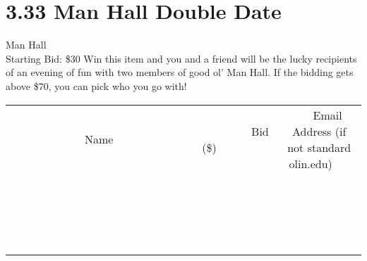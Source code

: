 \documentclass[11pt]{article}
\begin{document}
\section*{3.33 Man Hall Double Date}
Man Hall
\\
Starting Bid: \$30
\newline
Win this item and you and a friend will be the lucky recipients of an evening of fun with two members of good ol' Man Hall. If the bidding gets above \$70, you can pick who you go with!
\\[3ex]
\begin{tabular}{c c c}
~~~~~~~~~~~~~Name~~~~~~~~~~~~~ & ~~~~~~~~~Bid (\$)~~~~~~~~~  & ~~~Email Address (if not standard olin.edu)~~~\\
 & & \\
\hline
 & & \\
\hline
 & & \\
\hline
 & & \\
\hline
 & & \\
\hline
 & & \\
\hline
 & & \\
\hline
 & & \\
\hline
 & & \\
\hline
 & & \\
\hline
 & & \\
\hline
 & & \\
\hline
 & & \\
\hline
 & & \\
\hline
 & & \\
\hline
 & & \\
\hline
 & & \\
\hline
 & & \\
\hline
 & & \\
\hline
\end{tabular}
\newpage
\end{document}
